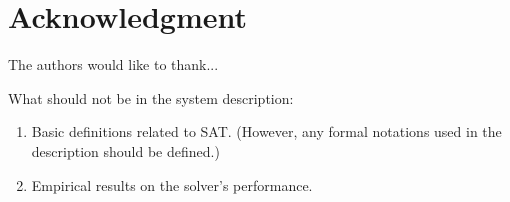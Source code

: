 \documentclass[conference]{IEEEtran}
\begin{document}
\section*{Acknowledgment}
The authors would like to thank...

\bigskip
What should not be in the system description:
\begin{enumerate}
  \item Basic definitions related to SAT. (However, any formal notations used in the description should be defined.)
  \item Empirical results on the solver's performance.
\end{enumerate}



\end{document}
